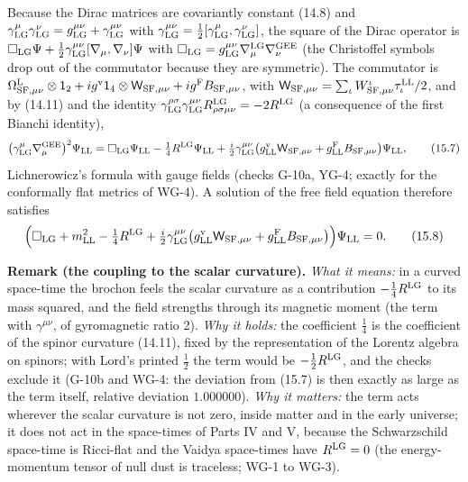 \documentclass[
  10pt,
]{article}
\begin{document}
Because the Dirac matrices are covariantly constant (14.8) and
\(\gamma^\mu_{\rm LG}\gamma^\nu_{\rm LG}=g_{\rm LG}^{\mu\nu}+\gamma^{\mu\nu}_{\rm LG}\)
with
\(\gamma^{\mu\nu}_{\rm LG}=\tfrac12[\gamma^\mu_{\rm LG},\gamma^\nu_{\rm LG}]\),
the square of the Dirac operator is
\(\Box_{\rm LG}\Psi+\tfrac12\gamma^{\mu\nu}_{\rm LG}[\nabla_\mu,\nabla_\nu]\Psi\)
with
\(\Box_{\rm LG}=g_{\rm LG}^{\mu\nu}\nabla^{\rm LG}_\mu\nabla^{\rm GEE}_\nu\)
(the Christoffel symbols drop out of the commutator because they are
symmetric). The commutator is
\(\Omega^{\rm L}_{{\rm SF},\mu\nu}\otimes\mathsf 1_2+ig^{\rm v}\mathsf 1_4\otimes\mathsf W_{{\rm SF},\mu\nu}+ig^{\rm F}B_{{\rm SF},\mu\nu}\),
with
\(\mathsf W_{{\rm SF},\mu\nu}=\sum_\iota W^\iota_{{\rm SF},\mu\nu}\tau^{\rm LL}_\iota/2\),
and by (14.11) and the identity
\(\gamma^{\rho\sigma}_{\rm LG}\gamma^{\mu\nu}_{\rm LG}R^{\rm LG}_{\rho\sigma\mu\nu}=-2R^{\rm LG}\)
(a consequence of the first Bianchi identity),
\[\big(\gamma^\mu_{\rm LG}\nabla^{\rm GEE}_\mu\big)^2\Psi_{\rm LL}=\Box_{\rm LG}\Psi_{\rm LL}-\tfrac14R^{\rm LG}\Psi_{\rm LL}+\tfrac i2\gamma^{\mu\nu}_{\rm LG}\big(g^{\rm v}_{\rm LL}\mathsf W_{{\rm SF},\mu\nu}+g^{\rm F}_{\rm LL}B_{{\rm SF},\mu\nu}\big)\Psi_{\rm LL},\tag{15.7}\]
Lichnerowicz's formula with gauge fields (checks G-10a, YG-4; exactly
for the conformally flat metrics of WG-4). A solution of the free field
equation therefore satisfies
\[\Big(\Box_{\rm LG}+m_{\rm LL}^2-\tfrac14R^{\rm LG}+\tfrac i2\gamma^{\mu\nu}_{\rm LG}\big(g^{\rm v}_{\rm LL}\mathsf W_{{\rm SF},\mu\nu}+g^{\rm F}_{\rm LL}B_{{\rm SF},\mu\nu}\big)\Big)\Psi_{\rm LL}=0.\tag{15.8}\]

\textbf{Remark (the coupling to the scalar curvature).} \emph{What it
means:} in a curved space-time the brochon feels the scalar curvature as
a contribution \(-\tfrac14R^{\rm LG}\) to its mass squared, and the
field strengths through its magnetic moment (the term with
\(\gamma^{\mu\nu}\), of gyromagnetic ratio 2). \emph{Why it holds:} the
coefficient \(\tfrac14\) is the coefficient of the spinor curvature
(14.11), fixed by the representation of the Lorentz algebra on spinors;
with Lord's printed \(\tfrac12\) the term would be
\(-\tfrac12R^{\rm LG}\), and the checks exclude it (G-10b and WG-4: the
deviation from (15.7) is then exactly as large as the term itself,
relative deviation \(1.000000\)). \emph{Why it matters:} the term acts
wherever the scalar curvature is not zero, inside matter and in the
early universe; it does not act in the space-times of Parts IV and V,
because the Schwarzschild space-time is Ricci-flat and the Vaidya
space-times have \(R^{\rm LG}=0\) (the energy-momentum tensor of null
dust is traceless; WG-1 to WG-3).
\end{document}
